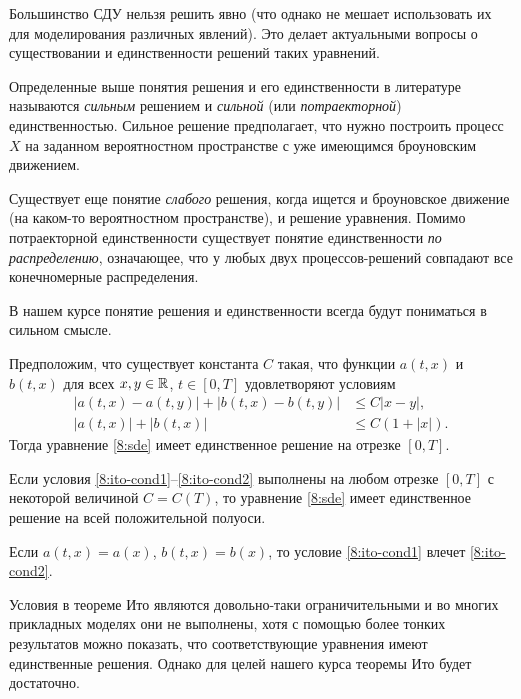 \begin{remark}
Большинство СДУ нельзя решить явно (что однако не мешает использовать их для моделирования различных явлений).
Это делает актуальными вопросы о существовании и единственности решений таких уравнений.

Определенные выше понятия решения и его единственности в литературе называются \emph{сильным} решением и \emph{сильной} (или \emph{потраекторной}) единственностью.
Сильное решение предполагает, что нужно построить процесс $X$ на заданном вероятностном пространстве с уже имеющимся броуновским движением.

Существует еще понятие \emph{слабого} решения, когда ищется и броуновское движение (на каком-то вероятностном пространстве), и решение уравнения.
Помимо потраекторной единственности существует понятие единственности \emph{по распределению}, означающее, что у любых двух процессов-решений совпадают все конечномерные распределения.

В нашем курсе понятие решения и единственности всегда будут пониматься в сильном смысле.
\end{remark}



\begin{theorem}[Ито]
\label{8:t:ito-existence}
Предположим, что существует константа $C$ такая, что  функции $a(t,x)$ и $b(t,x)$ для всех $x,y\in\mathbb{R}$, $t\in[0,T]$ удовлетворяют условиям
\begin{align}
\label{8:ito-cond1}
|a(t,x) - a(t,y)| + |b(t,x) - b(t,y)| &\le C|x-y|,\\
\label{8:ito-cond2}
|a(t,x)| + |b(t,x)| &\le C(1+|x|).
\end{align}
Тогда уравнение \eqref{8:sde} имеет единственное решение на отрезке $[0,T]$.

Если условия \eqref{8:ito-cond1}--\eqref{8:ito-cond2} выполнены на любом отрезке $[0,T]$ с некоторой величиной $C=C(T)$, то уравнение \eqref{8:sde} имеет единственное решение на всей положительной полуоси.
\end{theorem}

\begin{remark}
Если $a(t,x) = a(x)$, $b(t,x) = b(x)$, то условие \eqref{8:ito-cond1} влечет \eqref{8:ito-cond2}.
\end{remark}

Условия в теореме Ито являются довольно-таки ограничительными и во многих прикладных моделях они не выполнены, хотя с помощью более тонких результатов можно показать, что соответствующие уравнения имеют единственные решения.
Однако для целей нашего курса теоремы Ито будет достаточно.

